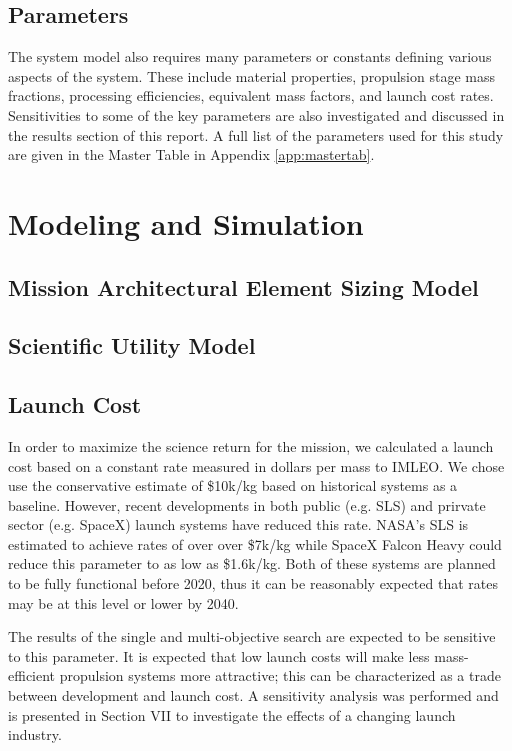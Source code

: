 \documentclass[]{aiaa-pretty}
\begin{document}
\subsection{Parameters}
\label{sec:params}
The system model also requires many parameters or constants defining various aspects of the system. These include material properties, propulsion stage mass fractions, processing efficiencies, equivalent mass factors, and launch cost rates. Sensitivities to some of the key parameters are also investigated and discussed in the results section of this report. A full list of the parameters used for this study are given in the Master Table in Appendix \ref{app:mastertab}. 

\section{Modeling and Simulation}
\label{sec:model}

\subsection{Mission Architectural Element Sizing Model}
	
\subsection{Scientific Utility Model}

\subsection{Launch Cost}
In order to maximize the science return for the mission, we calculated a launch cost based on a constant rate measured in dollars per mass to IMLEO. We chose use the conservative estimate of \$10k/kg based on historical systems as a baseline. However, recent developments in both public (e.g. SLS) and prirvate sector (e.g. SpaceX) launch systems have reduced this rate. NASA’s SLS is estimated to achieve rates of over over \$7k/kg while SpaceX Falcon Heavy could reduce this parameter to as low as \$1.6k/kg. \cite{jones2015estimating} Both of these systems are planned to be fully functional before 2020, thus it can be reasonably expected that rates may be at this level or lower by 2040. 

The results of the single and multi-objective search are expected to be sensitive to this parameter. It is expected that low launch costs will make less mass-efficient propulsion systems more attractive; this can be characterized as a trade between development and launch cost. A sensitivity analysis was performed and is presented in Section VII to investigate the effects of a changing launch industry. 	
\end{document}
